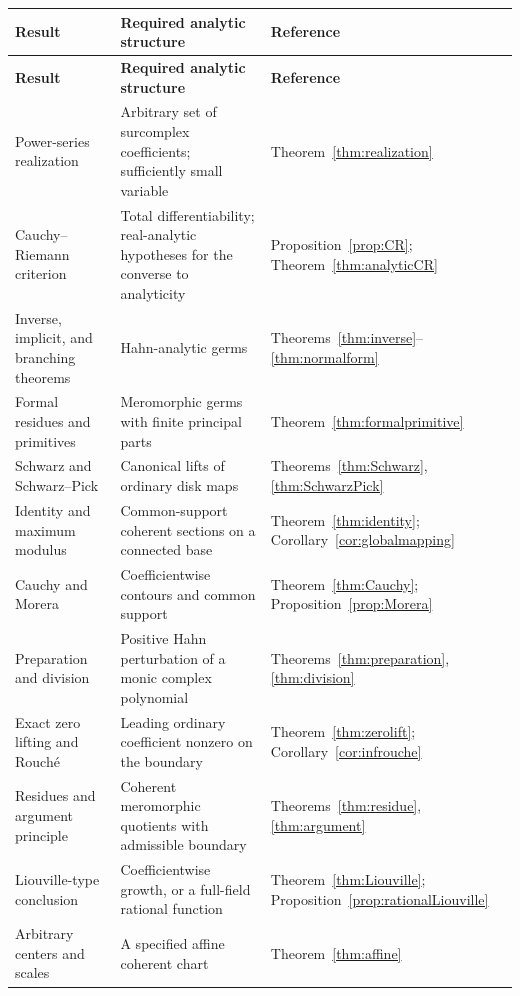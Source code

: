 \documentclass[11pt,a4paper]{article}
\theoremstyle{definition}\newtheorem{definition}[theorem]{Definition}
\theoremstyle{remark}\newtheorem{remark}[theorem]{Remark}
\numberwithin{equation}{section}
\begin{document}
\begin{longtable}{@{}>{\raggedright\arraybackslash}p{}>{\raggedright\arraybackslash}p{}>{\raggedright\arraybackslash}p{}@{}}
\toprule
\textbf{Result} & \textbf{Required analytic structure} & \textbf{Reference}\\
\midrule
\endfirsthead
\toprule
\textbf{Result} & \textbf{Required analytic structure} & \textbf{Reference}\\
\midrule
\endhead
\bottomrule
\endfoot
Power-series realization & Arbitrary set of surcomplex coefficients; sufficiently small variable & Theorem~\ref{thm:realization}\\[5pt]
Cauchy--Riemann criterion & Total differentiability; real-analytic hypotheses for the converse to analyticity & Proposition~\ref{prop:CR}; Theorem~\ref{thm:analyticCR}\\[5pt]
Inverse, implicit, and branching theorems & Hahn-analytic germs & Theorems~\ref{thm:inverse}--\ref{thm:normalform}\\[5pt]
Formal residues and primitives & Meromorphic germs with finite principal parts & Theorem~\ref{thm:formalprimitive}\\[5pt]
Schwarz and Schwarz--Pick & Canonical lifts of ordinary disk maps & Theorems~\ref{thm:Schwarz}, \ref{thm:SchwarzPick}\\[5pt]
Identity and maximum modulus & Common-support coherent sections on a connected base & Theorem~\ref{thm:identity}; Corollary~\ref{cor:globalmapping}\\[5pt]
Cauchy and Morera & Coefficientwise contours and common support & Theorem~\ref{thm:Cauchy}; Proposition~\ref{prop:Morera}\\[5pt]
Preparation and division & Positive Hahn perturbation of a monic complex polynomial & Theorems~\ref{thm:preparation}, \ref{thm:division}\\[5pt]
Exact zero lifting and Rouch\'e & Leading ordinary coefficient nonzero on the boundary & Theorem~\ref{thm:zerolift}; Corollary~\ref{cor:infrouche}\\[5pt]
Residues and argument principle & Coherent meromorphic quotients with admissible boundary & Theorems~\ref{thm:residue}, \ref{thm:argument}\\[5pt]
Liouville-type conclusion & Coefficientwise growth, or a full-field rational function & Theorem~\ref{thm:Liouville}; Proposition~\ref{prop:rationalLiouville}\\[5pt]
Arbitrary centers and scales & A specified affine coherent chart & Theorem~\ref{thm:affine}\\
\end{longtable}
\end{document}

